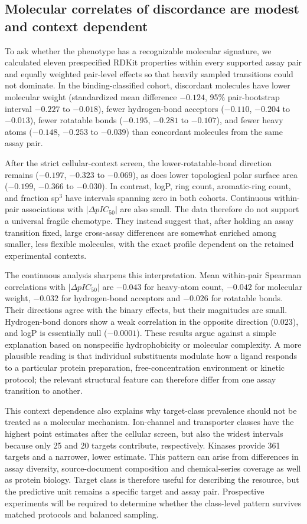 \documentclass[letterpaper]{article}
\begin{document}
\subsection{Molecular correlates of discordance are modest and context dependent}

To ask whether the phenotype has a recognizable molecular signature, we calculated eleven prespecified RDKit properties within every supported assay pair and equally weighted pair-level effects so that heavily sampled transitions could not dominate. In the binding-classified cohort, discordant molecules have lower molecular weight (standardized mean difference $-0.124$, 95\% pair-bootstrap interval $-0.227$ to $-0.018$), fewer hydrogen-bond acceptors ($-0.110$, $-0.204$ to $-0.013$), fewer rotatable bonds ($-0.195$, $-0.281$ to $-0.107$), and fewer heavy atoms ($-0.148$, $-0.253$ to $-0.039$) than concordant molecules from the same assay pair.

After the strict cellular-context screen, the lower-rotatable-bond direction remains ($-0.197$, $-0.323$ to $-0.069$), as does lower topological polar surface area ($-0.199$, $-0.366$ to $-0.030$). In contrast, logP, ring count, aromatic-ring count, and fraction sp$^3$ have intervals spanning zero in both cohorts. Continuous within-pair associations with $|\Delta pIC_{50}|$ are also small. The data therefore do not support a universal fragile chemotype. They instead suggest that, after holding an assay transition fixed, large cross-assay differences are somewhat enriched among smaller, less flexible molecules, with the exact profile dependent on the retained experimental contexts.

The continuous analysis sharpens this interpretation. Mean within-pair Spearman correlations with $|\Delta pIC_{50}|$ are $-0.043$ for heavy-atom count, $-0.042$ for molecular weight, $-0.032$ for hydrogen-bond acceptors and $-0.026$ for rotatable bonds. Their directions agree with the binary effects, but their magnitudes are small. Hydrogen-bond donors show a weak correlation in the opposite direction ($0.023$), and logP is essentially null ($-0.0001$). These results argue against a simple explanation based on nonspecific hydrophobicity or molecular complexity. A more plausible reading is that individual substituents modulate how a ligand responds to a particular protein preparation, free-concentration environment or kinetic protocol; the relevant structural feature can therefore differ from one assay transition to another.

This context dependence also explains why target-class prevalence should not be treated as a molecular mechanism. Ion-channel and transporter classes have the highest point estimates after the cellular screen, but also the widest intervals because only 25 and 20 targets contribute, respectively. Kinases provide 361 targets and a narrower, lower estimate. This pattern can arise from differences in assay diversity, source-document composition and chemical-series coverage as well as protein biology. Target class is therefore useful for describing the resource, but the predictive unit remains a specific target and assay pair. Prospective experiments will be required to determine whether the class-level pattern survives matched protocols and balanced sampling.
\end{document}

